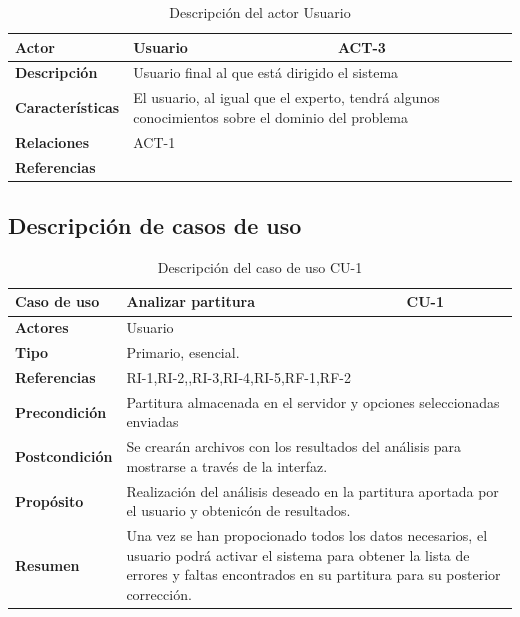 \begin{table}[H]
	\begin{tabular}{@{}|l|p{9cm}|p{2cm}|@{}}
		\hline
		\textbf{Actor} & Usuario & \cellcolor[HTML]{C0C0C0}ACT-3 \\ \hline
		\textbf{Descripción} & \multicolumn{2}{p{11cm}|}{Usuario final al que está dirigido el sistema} \\ \hline
		\textbf{Características} & \multicolumn{2}{p{11cm}|}{El usuario, al igual que el experto, tendrá algunos conocimientos sobre el dominio del problema} \\ \hline
		\textbf{Relaciones} & \multicolumn{2}{p{11cm}|}{ACT-1} \\ \hline
		\textbf{Referencias} & \multicolumn{2}{p{11cm}|}{} \\ \hline
	\end{tabular}
	\caption{Descripción del actor Usuario}
	\label{tablaACT3}
\end{table}

\subsection{Descripción de casos de uso}

\begin{table}[H]
	\begin{tabular}{@{}|l|p{9cm}|p{2cm}|@{}}
		\hline
		\textbf{Caso de uso} & Analizar partitura & \cellcolor[HTML]{C0C0C0}CU-1 \\ \hline
		\textbf{Actores} & \multicolumn{2}{p{11cm}|}{Usuario} \\ \hline 
		\textbf{Tipo} & \multicolumn{2}{p{11cm}|}{Primario, esencial.} \\ \hline
		\textbf{Referencias} & \multicolumn{2}{p{11cm}|}{RI-1,RI-2,,RI-3,RI-4,RI-5,RF-1,RF-2} \\ \hline
		\textbf{Precondición} & \multicolumn{2}{p{11cm}|}{Partitura almacenada en el servidor y opciones seleccionadas enviadas} \\ \hline
		\textbf{Postcondición} & \multicolumn{2}{p{11cm}|}{Se crearán archivos con los resultados del análisis para mostrarse a través de la interfaz.} \\ \hline
		\textbf{Propósito} & \multicolumn{2}{p{11cm}|}{Realización del análisis deseado en la partitura aportada por el usuario y obtenicón de resultados.} \\ \hline
		\textbf{Resumen} & \multicolumn{2}{p{11cm}|}{Una vez se han propocionado todos los datos necesarios, el usuario podrá activar el sistema para obtener la lista de errores y faltas encontrados en su partitura para su posterior corrección.} \\ \hline
	\end{tabular}
	\caption{Descripción del caso de uso CU-1}
	\label{CU-1}
\end{table}

